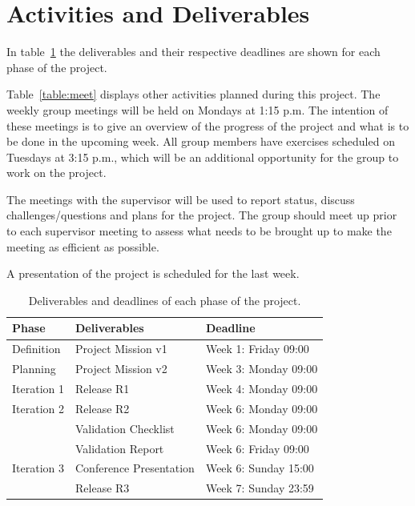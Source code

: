 \documentclass[10pt,a4paper]{article}
\begin{document}
\section{Activities and Deliverables}

In table~\ref{table:deliv} the deliverables and their respective deadlines are shown for each phase of the project. 

Table~\ref{table:meet} displays other activities planned during this project. The weekly group meetings will be held on Mondays at 1:15 p.m. The intention of these meetings is to give an overview of the progress of the project and what is to be done in the upcoming week. All group members have exercises scheduled on Tuesdays at 3:15 p.m., which will be an additional opportunity for the group to work on the project. 

The meetings with the supervisor will be used to report status, discuss challenges/questions and plans for the project. The group should meet up prior to each supervisor meeting to assess what needs to be brought up to make the meeting as efficient as possible. 

A presentation of the project is scheduled for the last week.



\begin{table}[h!]
\centering
\caption{Deliverables and deadlines of each phase of the project.}
\label{table:deliv}
\begin{tabular}{|l|l|l|} \hline
\textbf{Phase} & \textbf{Deliverables} & \textbf{Deadline}\\ \hline
Definition & Project Mission v1 & Week 1: Friday 09:00\\ \hline
Planning & Project Mission v2 & Week 3: Monday 09:00\\ \hline
Iteration 1 & Release R1 & Week 4: Monday 09:00\\ \hline
Iteration 2 & Release R2 & Week 6: Monday 09:00\\ \hline
& Validation Checklist & Week 6: Monday 09:00\\ \hline
& Validation Report & Week 6: Friday 09:00\\ \hline
Iteration 3 & Conference Presentation & Week 6: Sunday 15:00\\ \hline
& Release R3 & Week 7: Sunday 23:59\\ \hline
\end{tabular}\\
\end{table}
\end{document}
